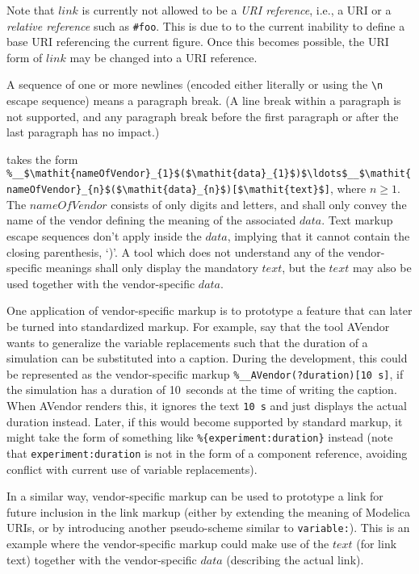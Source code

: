 \begin{nonnormative}
Note that $\mathit{link}$ is currently not allowed to be a \emph{URI reference}, i.e., a URI or a \emph{relative reference} such as \lstinline!#foo!.
This is due to to the current inability to define a base URI referencing the current figure.
Once this becomes possible, the URI form of $\mathit{link}$ may be changed into a URI reference.
\end{nonnormative}

A sequence of one or more newlines (encoded either literally or using the \lstinline!\n! escape sequence) means a paragraph break.
(A line break within a paragraph is not supported, and any paragraph break before the first paragraph or after the last paragraph has no impact.)

 takes the form \lstinline!%__$\mathit{nameOfVendor}_{1}$($\mathit{data}_{1}$)$\ldots$__$\mathit{nameOfVendor}_{n}$($\mathit{data}_{n}$)[$\mathit{text}$]!, where $n \geq 1$.
The $\mathit{nameOfVendor}$ consists of only digits and letters, and shall only convey the name of the vendor defining the meaning of the associated $\mathit{data}$.
Text markup escape sequences don't apply inside the $\mathit{data}$, implying that it cannot contain the closing parenthesis, `)'.
A tool which does not understand any of the vendor-specific meanings shall only display the mandatory $\mathit{text}$, but the $\mathit{text}$ may also be used together with the vendor-specific $\mathit{data}$.

\begin{example}
One application of vendor-specific markup is to prototype a feature that can later be turned into standardized markup.
For example, say that the tool AVendor wants to generalize the variable replacements such that the duration of a simulation can be substituted into a caption.
During the development, this could be represented as the vendor-specific markup \lstinline!%__AVendor(?duration)[10 s]!, if the simulation has a duration of 10~seconds at the time of writing the caption.
When AVendor renders this, it ignores the text \lstinline!10 s! and just displays the actual duration instead.
Later, if this would become supported by standard markup, it might take the form of something like \lstinline!%{experiment:duration}! instead (note that \lstinline!experiment:duration! is not in the form of a component reference, avoiding conflict with current use of variable replacements).

In a similar way, vendor-specific markup can be used to prototype a link for future inclusion in the link markup (either by extending the meaning of Modelica URIs, or by introducing another pseudo-scheme similar to \lstinline!variable:!).
This is an example where the vendor-specific markup could make use of the $\mathit{text}$ (for link text) together with the vendor-specific $\mathit{data}$ (describing the actual link).
\end{example}

